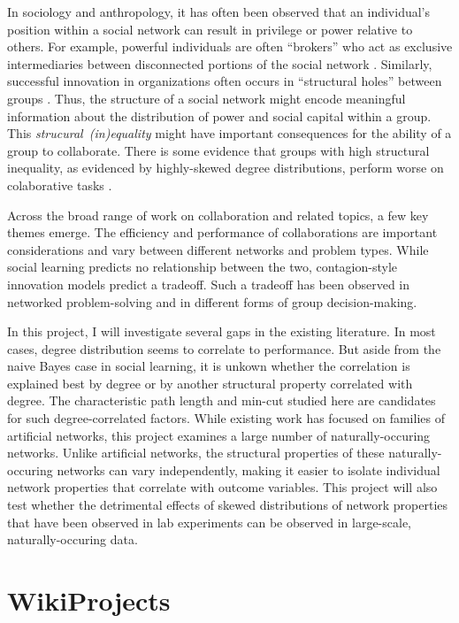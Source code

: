 \documentclass[10pt,twocolumn]{article}
\newcommand{\+}{\phantom{-}}
\begin{document}
In sociology and anthropology, it has often been observed that an individual's
position within a social network can result in privilege or power relative to
others.
For example, powerful individuals are often ``brokers''
who act as exclusive intermediaries between disconnected portions of the
social network \mbox{\cite{silverman_patronage_1965}}.
Similarly, successful innovation in organizations often occurs in ``structural
holes'' between groups \mbox{\cite{granovetter_strength_1973}}.
Thus, the structure of a social network might encode meaningful information
about the distribution of power and social capital within a group.
This \mbox{\em strucural (in)equality} might have important consequences for the
ability of a group to collaborate.
There is some evidence that groups with high structural inequality,
as evidenced by highly-skewed degree distributions,
perform worse on colaborative tasks \mbox{\cite{kearns_experiments_2012}}.

Across the broad range of work on collaboration and related topics,
a few key themes emerge.
The efficiency and performance of collaborations are important considerations
and vary between different networks and problem types.
While social learning predicts no relationship between the two,
contagion-style innovation models predict a tradeoff.
Such a tradeoff has been observed in networked problem-solving and in
different forms of group decision-making.

In this project, I will investigate several gaps in the existing literature.
In most cases, degree distribution seems to correlate to performance.
But aside from the naive Bayes case in social learning, it is unkown whether
the correlation is explained best by degree or by another structural property
correlated with degree.
The characteristic path length and min-cut studied here are candidates for such
degree-correlated factors.
While existing work has focused on families of artificial networks,
this project examines a large number of naturally-occuring networks.
Unlike artificial networks, the structural properties of these naturally-occuring
networks can vary independently, making it easier to isolate individual
network properties that correlate with outcome variables.
This project will also test whether the detrimental effects of skewed
distributions of network properties that have been observed in lab experiments
\mbox{\cite{kearns_experiments_2012}}
can be observed in large-scale, naturally-occuring data.

\section{WikiProjects}
\end{document}
